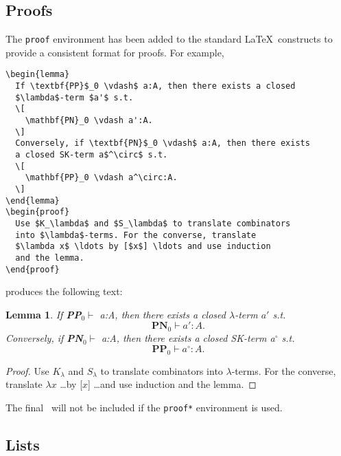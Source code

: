 \documentclass[cup6a]{cupbook}
\begin{document}
\subsection{Proofs}
\newtheorem{lemma}{Lemma}[section]

The \verb"proof" environment has been added to the standard \LaTeX\
constructs to provide a consistent format for proofs.
 For example,
 \begin{verbatim}
\begin{lemma}
  If \textbf{PP}$_0 \vdash$ a:A, then there exists a closed
  $\lambda$-term $a'$ s.t.
  \[
    \mathbf{PN}_0 \vdash a':A.
  \]
  Conversely, if \textbf{PN}$_0 \vdash$ a:A, then there exists
  a closed SK-term a$^\circ$ s.t.
  \[
    \mathbf{PP}_0 \vdash a^\circ:A.
  \]
\end{lemma}
\begin{proof}
  Use $K_\lambda$ and $S_\lambda$ to translate combinators
  into $\lambda$-terms. For the converse, translate
  $\lambda x$ \ldots by [$x$] \ldots and use induction
  and the lemma.
\end{proof}
\end{verbatim}
produces the following text:
 \begin{lemma}
  If \textbf{PP}$_0 \vdash$ a:A, then there exists a closed $\lambda$-term
  $a'$ s.t.
  \[
   \mathbf{PN}_0 \vdash a':A.
  \]
  Conversely, if \textbf{PN}$_0 \vdash$ a:A, then there exists a closed
  SK-term a$^\circ$ s.t.
  \[
   \mathbf{PP}_0 \vdash a^\circ:A.
  \]
 \end{lemma}
 \begin{proof}
  Use $K_\lambda$ and $S_\lambda$ to translate combinators into
  $\lambda$-terms. For the converse, translate $\lambda x$ \ldots by
  [$x$] \ldots and use induction and the lemma.
 \end{proof}
 The final \proofbox\ will not be included if the \verb|proof*|
environment is used.

\subsection{Lists}
\end{document}
